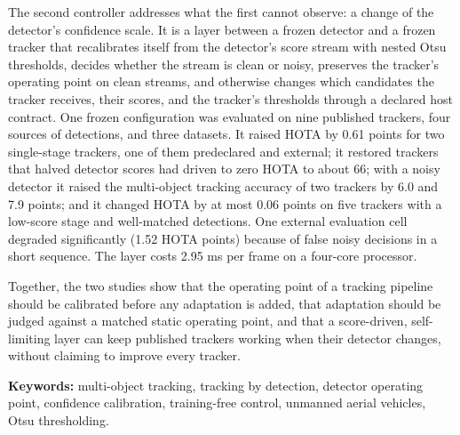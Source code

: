 The second controller addresses what the first cannot observe: a change of the detector's confidence scale. It is a layer between a frozen detector and a frozen tracker that recalibrates itself from the detector's score stream with nested Otsu thresholds, decides whether the stream is clean or noisy, preserves the tracker's operating point on clean streams, and otherwise changes which candidates the tracker receives, their scores, and the tracker's thresholds through a declared host contract. One frozen configuration was evaluated on nine published trackers, four sources of detections, and three datasets. It raised HOTA by 0.61 points for two single-stage trackers, one of them predeclared and external; it restored trackers that halved detector scores had driven to zero HOTA to about 66; with a noisy detector it raised the multi-object tracking accuracy of two trackers by 6.0 and 7.9 points; and it changed HOTA by at most 0.06 points on five trackers with a low-score stage and well-matched detections. One external evaluation cell degraded significantly (1.52 HOTA points) because of false noisy decisions in a short sequence. The layer costs 2.95 ms per frame on a four-core processor.

Together, the two studies show that the operating point of a tracking pipeline should be calibrated before any adaptation is added, that adaptation should be judged against a matched static operating point, and that a score-driven, self-limiting layer can keep published trackers working when their detector changes, without claiming to improve every tracker.

\vspace{0.5cm}
\noindent\textbf{Keywords:} multi-object tracking, tracking by detection, detector operating point, confidence calibration, training-free control, unmanned aerial vehicles, Otsu thresholding.
